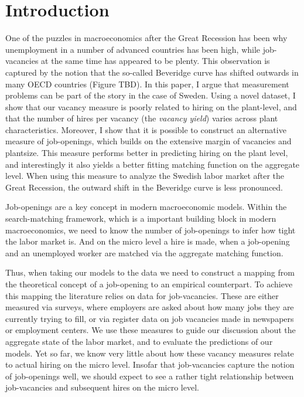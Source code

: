 \section{Introduction}

One of the puzzles in macroeconomics after the Great Recession has been why unemployment in a number of advanced countries has been high, while job-vacancies at the same time has appeared to be plenty. This observation is captured by the notion that the so-called Beveridge curve has shifted outwards in many OECD countries (Figure TBD). In this paper, I argue that measurement problems can be part of the story in the case of Sweden. Using a novel dataset, I show that our vacancy measure is poorly related to hiring on the plant-level, and that the number of hires per vacancy (the \emph{vacancy yield}) varies across plant characteristics. Moreover, I show that it is possible to construct an alternative measure of job-openings, which builds on the extensive margin of vacancies and plantsize. This measure performs better in predicting hiring on the plant level, and interestingly it also yields a better fitting matching function on the aggregate level. When using this measure to analyze the Swedish labor market after the Great Recession, the outward shift in the Beveridge curve is less pronounced. 

Job-openings are a key concept in modern macroeconomic models. Within the search-matching framework, which is a important building block in modern macroeconomics, we need to know the number of job-openings to infer how tight the labor market is. And on the micro level a hire is made, when a job-opening and an unemployed worker are matched via the aggregate matching function.

Thus, when taking our models to the data we need to construct a mapping from the theoretical concept of a job-opening to an empirical counterpart. To achieve this mapping the literature relies on data for job-vacancies. These are either measured via surveys, where employers are asked about how many jobs they are currently trying to fill, or via register data on job vacancies made in newspapers or employment centers. We use these measures to guide our discussion about the aggregate state of the labor market, and to evaluate the predictions of our models. Yet so far, we know very little about how these vacancy measures relate to actual hiring on the micro level. Insofar that job-vacancies capture the notion of job-openings well, we should expect to see a rather tight relationship between job-vacancies and subsequent hires on the micro level. 

